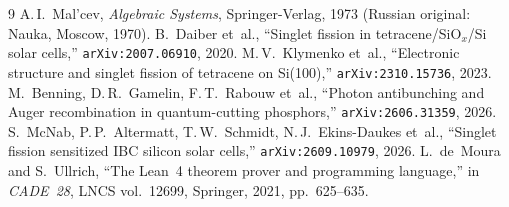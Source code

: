 \documentclass[11pt,a4paper]{article}
\theoremstyle{plain}
\theoremstyle{definition}
\begin{document}
\begin{thebibliography}{9}
A.\,I.~Mal'cev, \emph{Algebraic Systems}, Springer-Verlag, 1973 (Russian original: Nauka, Moscow, 1970).
B.~Daiber et~al., ``Singlet fission in tetracene/SiO$_x$/Si solar cells,'' \texttt{arXiv:2007.06910}, 2020.
M.\,V.~Klymenko et~al., ``Electronic structure and singlet fission of tetracene on Si(100),'' \texttt{arXiv:2310.15736}, 2023.
M.~Benning, D.\,R.~Gamelin, F.\,T.~Rabouw et~al., ``Photon antibunching and Auger recombination in quantum-cutting phosphors,'' \texttt{arXiv:2606.31359}, 2026.
S.~McNab, P.\,P.~Altermatt, T.\,W.~Schmidt, N.\,J.~Ekins-Daukes et~al., ``Singlet fission sensitized IBC silicon solar cells,'' \texttt{arXiv:2609.10979}, 2026.
L.~de~Moura and S.~Ullrich, ``The Lean~4 theorem prover and programming language,'' in \emph{CADE~28}, LNCS vol.~12699, Springer, 2021, pp.~625--635.
\end{thebibliography}
\end{document}

